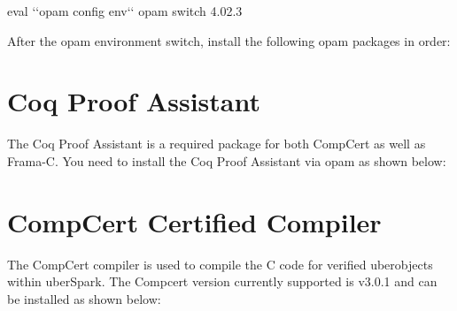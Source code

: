 \documentclass[letterpaper,10pt,english]{sphinxmanual}
\begin{document}
\begin{sphinxVerbatim}[commandchars=\\\{\}]
eval {}`{}`opam config env{}`{}`
opam switch 4.02.3
\end{sphinxVerbatim}

After the opam environment switch, install the following opam packages in order:

\begin{sphinxVerbatim}[commandchars=\\\{\}]
  
  
  
  
  
\end{sphinxVerbatim}


\section{Coq Proof Assistant}
\label{\detokenize{sw-requirements:coq-proof-assistant}}
The Coq Proof Assistant is a required package for both CompCert as well as Frama-C.
You need to install the Coq Proof Assistant via opam as shown below:

\begin{sphinxVerbatim}[commandchars=\\\{\}]
  
\end{sphinxVerbatim}


\section{CompCert Certified Compiler}
\label{\detokenize{sw-requirements:compcert-certified-compiler}}
The CompCert compiler is used to compile the C code for verified uberobjects within
uberSpark. The Compcert version currently supported is v3.0.1 and can be installed
as shown below:

\begin{sphinxVerbatim}[commandchars=\\\{\}]
 
  
 
 
 
  
 
\end{sphinxVerbatim}
\end{document}
